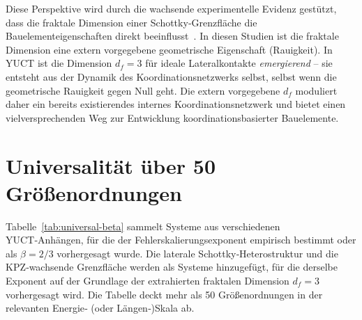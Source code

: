 \documentclass[12pt,a4paper]{article}
\begin{document}
	Diese Perspektive wird durch die wachsende experimentelle Evidenz gestützt,
	dass die fraktale Dimension einer Schottky‑Grenzfläche die
	Bauelementeigenschaften direkt beeinflusst~\cite{FractalSchottky}. In diesen
	Studien ist die fraktale Dimension eine extern vorgegebene geometrische
	Eigenschaft (Rauigkeit). In YUCT ist die Dimension $d_f = 3$ für ideale
	Lateralkontakte \emph{emergierend} – sie entsteht aus der Dynamik des
	Koordinationsnetzwerks selbst, selbst wenn die geometrische Rauigkeit gegen
	Null geht. Die extern vorgegebene $d_f$ moduliert daher ein bereits
	existierendes internes Koordinationsnetzwerk und bietet einen vielversprechenden
	Weg zur Entwicklung koordinationsbasierter Bauelemente.
	
	\section{Universalität über 50 Größenordnungen}
	Tabelle~\ref{tab:universal-beta} sammelt Systeme aus verschiedenen YUCT‑Anhängen,
	für die der Fehlerskalierungsexponent empirisch bestimmt oder als $\beta = 2/3$
	vorhergesagt wurde. Die laterale Schottky‑Heterostruktur und die KPZ‑wachsende
	Grenzfläche werden als Systeme hinzugefügt, für die derselbe Exponent auf der
	Grundlage der extrahierten fraktalen Dimension $d_f = 3$ vorhergesagt wird.
	Die Tabelle deckt mehr als 50 Größenordnungen in der relevanten Energie‑ (oder
	Längen‑)Skala ab.
	
\end{document}
